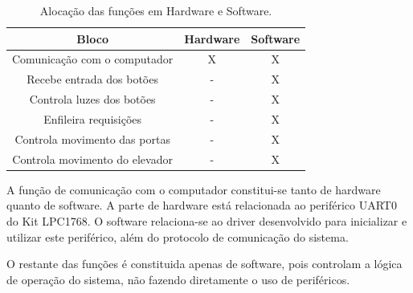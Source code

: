 \begin{table}[h!]
\caption{Alocação das funções em Hardware e Software.}
\centering
\begin{tabular}{|c|c|c|}
\hline
\textbf{Bloco} &\textbf{Hardware} & \textbf{Software} \\ \hline \hline
Comunicação com o computador & X & X \\
Recebe entrada dos botões & - & X \\
Controla luzes dos botões & - & X \\
Enfileira requisições & - & X \\
Controla movimento das portas & - & X \\
Controla movimento do elevador & - & X \\
\hline
\end{tabular}
\label{tab:publicacao}
\end{table}

A função de comunicação com o computador constitui-se tanto de hardware quanto de software. A parte de hardware está relacionada ao periférico UART0 do Kit LPC1768. O software relaciona-se ao driver desenvolvido para inicializar e utilizar este periférico, além do protocolo de comunicação do sistema.

O restante das funções é constituida apenas de software, pois controlam a lógica de operação do sistema, não fazendo diretamente o uso de periféricos.





